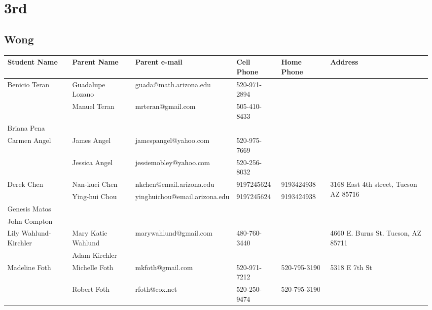 \documentclass[landscape]{article}\usepackage[]{graphicx}\usepackage[]{color}
\begin{document}
\section{3rd}
\subsection{Wong}
\begin{longtable}{|p{100pt}|p{100pt}|p{140pt}|p{60pt}|p{64pt}|p{120pt}|}
\textbf{Student Name} & \textbf{Parent Name} & \textbf{Parent e-mail} & \textbf{Cell Phone} & \textbf{Home Phone} & \textbf{Address}\\
\hline
\hline
\multirow{2}{100pt}{Benicio Teran} & Guadalupe Lozano & guada@math.arizona.edu & 520-971-2894 &  & \multirow{2}{120pt}{} \\
 & Manuel Teran & mrteran@gmail.com & 505-410-8433 &  & \\
\hline
\multirow{2}{100pt}{Briana Pena} &  &  &  &  & \multirow{2}{120pt}{} \\
 &  &  &  &  & \\
\hline
\multirow{2}{100pt}{Carmen Angel} & James Angel & jamespangel@yahoo.com & 520-975-7669 &  & \multirow{2}{120pt}{} \\
 & Jessica Angel & jessiemobley@yahoo.com & 520-256-8032 &  & \\
\hline
\multirow{2}{100pt}{Derek Chen} & Nan-kuei Chen & nkchen@email.arizona.edu & 9197245624 & 9193424938 & \multirow{2}{120pt}{3168 East 4th street, Tucson AZ 85716} \\
 & Ying-hui Chou & yinghuichou@email.arizona.edu & 9197245624 & 9193424938 & \\
\hline
\multirow{2}{100pt}{Genesis Matos} &  &  &  &  & \multirow{2}{120pt}{} \\
 &  &  &  &  & \\
\hline
\multirow{2}{100pt}{John Compton} &  &  &  &  & \multirow{2}{120pt}{} \\
 &  &  &  &  & \\
\hline
\multirow{2}{100pt}{Lily Wahlund-Kirchler} & Mary Katie Wahlund & marywahlund@gmail.com & 480-760-3440 &  & \multirow{2}{120pt}{4660 E. Burns St. Tucson, AZ 85711} \\
 & Adam Kirchler &  &  &  & \\
\hline
\multirow{2}{100pt}{Madeline Foth} & Michelle Foth & mkfoth@gmail.com & 520-971-7212 & 520-795-3190 & \multirow{2}{120pt}{5318 E 7th St} \\
 & Robert Foth & rfoth@cox.net & 520-250-9474 & 520-795-3190 & \\

\end{longtable}
\end{document}
